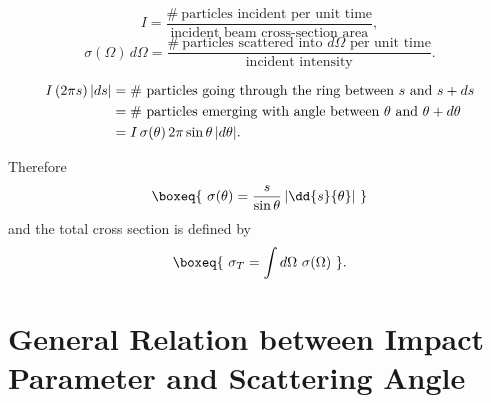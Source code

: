 \documentclass[11pt]{article}
\newcommand{\Om}{\Omega}
\begin{document}
\begin{equation}
I = \frac{\#\ \text{particles incident per unit time}}
         {\text{incident beam cross-section area}},
\end{equation}
\begin{equation}
\sigma(\Om)\,d\Om =
\frac{\#\ \text{particles scattered into }d\Om\text{ per unit time}}
     {\text{incident intensity}}.
\end{equation}

\begin{align}
I\,(2\pi s)\,\lvert ds\rvert
  &= \#\ \text{particles going through the ring between } s \text{ and } s+ds\notag\\
  &= \#\ \text{particles emerging with angle between } \theta \text{ and } \theta+d\theta\notag\\
  &= I\,\sigma(\theta)\,2\pi\sin\theta\,\lvert d\theta\rvert.
\end{align}

Therefore
\begin{equation}
\boxeq{\ \sigma(\theta) = \frac{s}{\sin\theta}\left\lvert \dd{s}{\theta}\right\rvert\ }
\label{eq:sigma-def}
\end{equation}
and the total cross section is defined by
\begin{equation}
\boxeq{\ \sigma_T = \int d\Om\ \sigma(\Om)\ }.
\label{eq:sigmaT-def}
\end{equation}

\section{General Relation between Impact Parameter and Scattering Angle}
\end{document}
